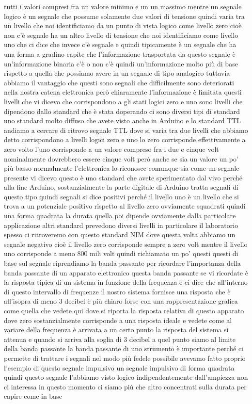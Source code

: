 {tutti i valori compresi fra un valore minimo e un un massimo mentre un segnale logico è un segnale che possume solamente due valori di tensione quindi varia tra un livello che noi identificiamo da un punto di vista logico come livello zero cioè non c'è segnale ha un altro livello di tensione che noi identificiamo come livello uno che ci dice che invece c'è segnale e quindi tipicamente è un segnale che ha una forma a gradino capite che l'informazione trasportata da questo segnale è un'informazione binaria c'è o non c'è quindi un'informazione molto più di base rispetto a quella che possiamo avere in un segnale di tipo analogico tuttavia abbiamo il vantaggio che questi sono segnali che difficilmente sono deteriorati nella nostra catena elettronica però chiaramente l'informazione è limitata questi livelli che vi dicevo che corrispondono a gli stati logici zero e uno sono livelli che dipendono dallo standard che è stata doperando ci sono diversi tipi di standard uno standard molto diffuso che avete visto anche in Arduino e lo standard TTL andiamo a cercare di ritrovo segnale TTL dove si varia tra due livelli che abbiamo detto corrispondono a livelli logici zero e uno lo zero corrisponde effettivamente a zero volto l'uno corrisponde a un valore compreso fra i due e cinque volt nominalmente dovrebbero essere cinque volt però anche se sia un valore un po' più basso normalmente l'elettronica lo riconosce comunque sia come un segnale presente vi dicevo questo è uno standard che avete sperimentato dal vivo perché alla fine Arduino, sostanzialmente la parte digitale di Arduino tratta segnali di questo tipo quindi segnali si dice positivi perché il livello uno è un livello che si trova a un potenziale positivo rispetto al livello zero ovviamente squadrati quindi una forma quadrata la durata quella poi dipende ovviamente dalla particolare applicazione altri standard prevedono diversi livelli in particolare il laboratorio spesso ci ritroveremo con questo standard NIM dove questa volta abbiamo un segnale negativo cioè il livello zero corrisponde sempre a zero volt mentre il livello uno corrisponde a meno 800 mili volt quindi richiamato un po' questi questi di base sul segnale riprendiamo la banda passante per ricordare l'importanza della banda passante di un apparato elettronico questa banda passante se vi ricordate è la risposta tipica di un sistema in funzione della frequenza e ci dice che all'interno di questo intervallo di frequenze il nostro sistema fornisce una risposta che è all'isopra di meno 3 decibel è più chiaro forse con una rappresentazione grafica come quella che vedete qui dove si riporta la risposta relativa di questo apparato dove zero sostanzialmente corrisponde a una risposta ideale e vedete come al variare della frequenza è arrivata a un certo punto la risposta del sistema si attenua e quando si arriva alla soglia di 3 decibel a quel punto siamo al limite della banda passante la banda passante di uno strumento è importante perché ci permette di trattare i segnali nel modo più fedele possibile avevamo fatto proprio l'esempio di questo segnale impulsivo un segnale impulsivo di forma quadrata quindi questo segnale l'abbiamo visto logico indipendentemente dall'ampiezza non ci interessa in questo momento ci siamo più che altro concentrati sulla durata per capire come in base }

